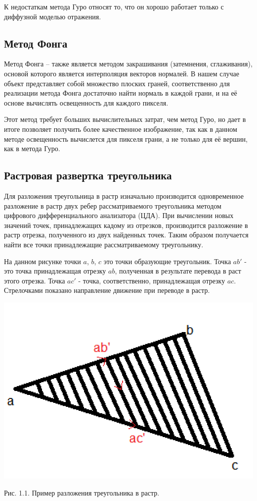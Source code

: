 \documentclass[12pt]{report}
\begin{document}
	К недостаткам метода Гуро относят то, что он хорошо работает только с диффузной моделью отражения. 

	\subsection{Метод Фонга}
	Метод Фонга – также является методом закрашивания (затемнения, сглаживания), основой которого является интерполяция векторов нормалей. В нашем случае объект представляет собой множество плоских граней, соответственно для реализации метода Фонга достаточно найти нормаль в каждой грани, и на её основе вычислять освещенность для каждого пикселя.
	
	Этот метод требует больших вычислительных затрат, чем метод Гуро, но дает в итоге позволяет получить более качественное изображение, так как в данном методе освещенность вычислется для пикселя грани, а не только для её вершин, как в метода Гуро.
	
	\subsection{Растровая развертка треугольника}
	
	Для разложения треугольница в растр изначально производится одновременное разложение в растр двух ребер рассматриваемого треугольника методом цифрового дифференциального анализатора (ЦДА). При вычислении новых значений точек, принадлежащих кадому из отрезков, производится разложение в растр отрезка, полученного из двух найденных точек. Таким образом получается найти все точки принадлежащие рассматриваемому треугольнику.
	
	На данном рисунке точки $a$, $b$, $c$ это точки образующие треугольник. Точка $ab'$ - это точка принадлежащая отрезку $ab$, полученная в результате перевода в раст этого отрезка. Точка $ac'$ - точка, соответственно, принадлежащая отрезку $ac$. Стрелочками показано направление движение при переводе в растр.
	\begin{center}
		\includegraphics[scale=0.7]{cda.png}
		
		Рис. 1.1. Пример разложения треугольника в растр.
	\end{center}
	
\end{document}
